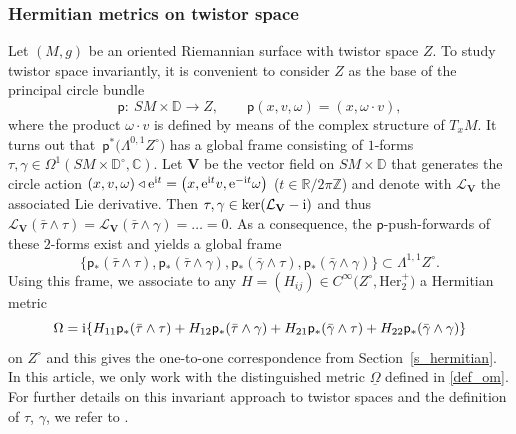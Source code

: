 \documentclass[10pt,a4paper]{amsart}
\numberwithin{equation}{section}
\theoremstyle{definition}
\newcommand{\Z}{\mathbb{Z}} %
\newcommand{\R}{\mathbb{R}} %
\newcommand{\C}{\mathbb{C}} %
\newcommand{\DD}{\mathbb{D}} %
\newcommand{\1}{{\bf 1}}
\newcommand{\Om}{{\underline{\Omega}}}
\newcommand{\act}{\triangleleft}
\begin{document}
\subsubsection{Hermitian metrics on twistor space}
Let $(M,g)$ be an oriented Riemannian surface with twistor space $Z$. To study twistor space invariantly, it is convenient to consider $Z$ as the base of the principal circle bundle
\[
	\mathsf{p}\colon\ SM\times \DD\rightarrow Z,\qquad \mathsf{p}(x,v,\omega)=(x,\omega\cdot v),
\]
where the product $\omega\cdot v$ is defined by means of the complex structure of $T_x M$.
It turns out that~$\mathsf{p}^* \bigl(\Lambda^{0,1}Z^\circ\bigr)$ has a global frame consisting of
$1$-forms
$
\tau,\gamma \in \Omega^1(SM\times \DD^\circ,\C)$.
Let $\mathbf V$ be the vector field on $SM\times \DD$ that generates the circle action $(x,v,\omega)\act {\rm e}^{{\rm i}t}=\bigl(x,{\rm e}^{{\rm i}t}v,{\rm e}^{-{\rm i}t}\omega\bigr)$ ($t\in \R/2\pi \Z$) and denote with $\mathcal L_{\mathbf V}$ the associated Lie derivative. Then $\tau,\gamma \in \ker (\mathcal L_\mathbf{V} - {\rm i})$ and thus $\mathcal L_{\mathbf V}(\bar \tau\wedge \tau)=\mathcal L_{\mathbf V}(\bar \tau\wedge \gamma)=\dots = 0$. As a consequence, the $\mathsf{p}$-push-forwards of these $2$-forms exist and yields a global frame
\[
	\{ \mathsf{p}_*(\bar \tau\wedge \tau),\mathsf{p}_*(\bar \tau\wedge \gamma),\mathsf{p}_*(\bar \gamma\wedge \tau),\mathsf{p}_*(\bar \gamma\wedge \gamma)\}\subset \Lambda^{1,1}Z^\circ.
\]
Using this frame, we associate to any $H=(H_{ij})\in C^\infty\bigl(Z^\circ,\mathrm{Her}_2^+\bigr)$ a Hermitian metric
\[
	 \Omega={\rm i}\{H_{11} \mathsf{p}_*(\bar \tau\wedge \tau)+ H_{12} \mathsf{p}_*(\bar \tau\wedge \gamma)+H_{21} \mathsf{p}_*(\bar \gamma\wedge \tau)+H_{22} \mathsf{p}_*(\bar \gamma\wedge \gamma) \}
\]
on $Z^\circ$ and this gives the one-to-one correspondence from Section~\ref{s_hermitian}. In this article, we only work with the distinguished metric $\Om$ defined in \eqref{def_om}.
For further details on this invariant approach to twistor spaces and the definition of $\tau$, $\gamma$, we refer to \cite{BLP24,BoPa23}.
\end{document}
